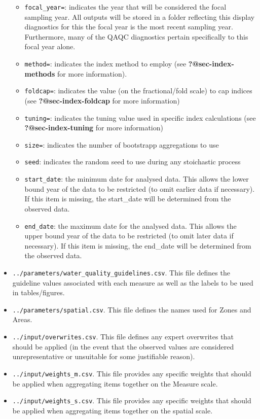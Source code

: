 \documentclass[
  8pt,
  a4paper]{article}
\providecommand{\tightlist}{%
  \setlength{\itemsep}{0pt}\setlength{\parskip}{0pt}}
\begin{document}
\begin{tcolorbox}
\begin{itemize}
  \begin{itemize}
  \tightlist
  \item
    \texttt{focal\_year=}: indicates the year that will be considered
    the focal sampling year. All outputs will be stored in a folder
    reflecting this display diagnostics for this the focal year is the
    most recent sampling year. Furthermore, many of the QAQC diagnostics
    pertain specifically to this focal year alone.
  \item
    \texttt{method=}: indicates the index method to employ (see
    \textbf{?@sec-index-methods} for more information).
  \item
    \texttt{foldcap=}: indicates the value (on the fractional/fold
    scale) to cap indices (see \textbf{?@sec-index-foldcap} for more
    information)
  \item
    \texttt{tuning=}: indicates the tuning value used in specific index
    calculations (see \textbf{?@sec-index-tuning} for more information)
  \item
    \texttt{size=}: indicates the number of bootstrapp aggregations to
    use
  \item
    \texttt{seed}: indicates the random seed to use during any
    stoichastic process
  \item
    \texttt{start\_date}: the minimum date for analysed data. This
    allows the lower bound year of the data to be restricted (to omit
    earlier data if necessary). If this item is missing, the start\_date
    will be determined from the observed data.
  \item
    \texttt{end\_date}: the maximum date for the analysed data. This
    allows the upper bound year of the data to be restricted (to omit
    later data if necessary). If this item is missing, the end\_date
    will be determined from the observed data.
  \end{itemize}
\item
  \texttt{../parameters/water\_quality\_guidelines.csv}. This file
  defines the guideline values associated with each measure as well as
  the labels to be used in tables/figures.
\item
  \texttt{../parameters/spatial.csv}. This file defines the names used
  for Zones and Areas.
\item
  \texttt{../input/overwrites.csv}. This file defines any expert
  overwrites that should be applied (in the event that the observed
  values are considered unrepresentative or unsuitable for some
  justifiable reason).
\item
  \texttt{../input/weights\_m.csv}. This file provides any specific
  weights that should be applied when aggregating items together on the
  Measure scale.
\item
  \texttt{../input/weights\_s.csv}. This file provides any specific
  weights that should be applied when aggregating items together on the
  spatial scale.
\end{itemize}

\end{tcolorbox}
\end{document}
